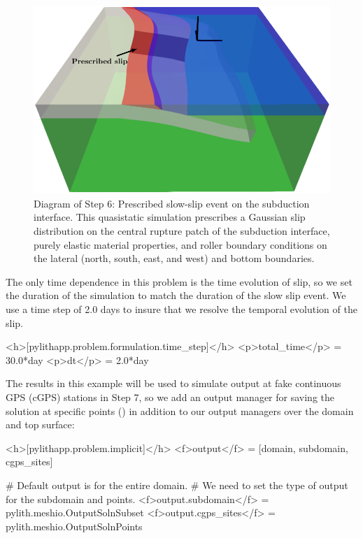 \begin{figure}[htbp]
  \includegraphics[scale=0.75]{examples/figs/subduction3d_step06_diagram}
  \caption{Diagram of Step 6: Prescribed slow-slip event on the
    subduction interface. This quasistatic simulation prescribes a
    Gaussian slip distribution on the central rupture patch of the
    subduction interface, purely elastic material properties, and
    roller boundary conditions on the lateral (north, south, east, and
    west) and bottom boundaries.}
  \label{fig:example:subduction:3d:step06:diagram}
\end{figure}


The only time dependence in this problem is the time evolution of
slip, so we set the duration of the simulation to match the duration
of the slow slip event. We use a time step of 2.0 days to insure that
we resolve the temporal evolution of the slip.
\begin{cfg}
<h>[pylithapp.problem.formulation.time_step]</h>
<p>total_time</p> = 30.0*day
<p>dt</p> = 2.0*day
\end{cfg}

The results in this example will be used to simulate output at fake
continuous GPS (cGPS) stations in Step 7, so we add an output manager
for saving the solution at specific points ()
in addition to our output managers over the domain and top surface:
\begin{cfg}
<h>[pylithapp.problem.implicit]</h>
<f>output</f> = [domain, subdomain, cgps_sites]

# Default output is for the entire domain.
# We need to set the type of output for the subdomain and points.
<f>output.subdomain</f> = pylith.meshio.OutputSolnSubset
<f>output.cgps_sites</f> = pylith.meshio.OutputSolnPoints
\end{cfg}

